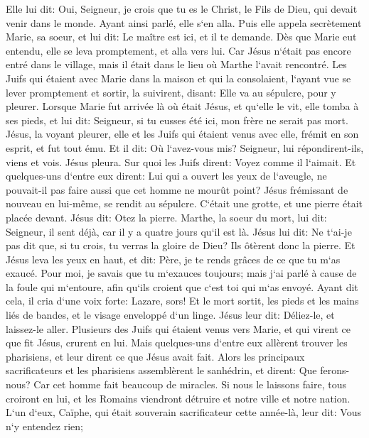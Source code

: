 \verse Elle lui dit: Oui, Seigneur, je crois que tu es le Christ, le Fils de Dieu, qui devait venir dans le monde. 
\verse Ayant ainsi parlé, elle s`en alla. Puis elle appela secrètement Marie, sa soeur, et lui dit: Le maître est ici, et il te demande. 
\verse Dès que Marie eut entendu, elle se leva promptement, et alla vers lui. 
\verse Car Jésus n`était pas encore entré dans le village, mais il était dans le lieu où Marthe l`avait rencontré. 
\verse Les Juifs qui étaient avec Marie dans la maison et qui la consolaient, l`ayant vue se lever promptement et sortir, la suivirent, disant: Elle va au sépulcre, pour y pleurer. 
\verse Lorsque Marie fut arrivée là où était Jésus, et qu`elle le vit, elle tomba à ses pieds, et lui dit: Seigneur, si tu eusses été ici, mon frère ne serait pas mort. 
\verse Jésus, la voyant pleurer, elle et les Juifs qui étaient venus avec elle, frémit en son esprit, et fut tout ému. 
\verse Et il dit: Où l`avez-vous mis? Seigneur, lui répondirent-ils, viens et vois. 
\verse Jésus pleura. 
\verse Sur quoi les Juifs dirent: Voyez comme il l`aimait. 
\verse Et quelques-uns d`entre eux dirent: Lui qui a ouvert les yeux de l`aveugle, ne pouvait-il pas faire aussi que cet homme ne mourût point? 
\verse Jésus frémissant de nouveau en lui-même, se rendit au sépulcre. C`était une grotte, et une pierre était placée devant. 
\verse Jésus dit: Otez la pierre. Marthe, la soeur du mort, lui dit: Seigneur, il sent déjà, car il y a quatre jours qu`il est là. 
\verse Jésus lui dit: Ne t`ai-je pas dit que, si tu crois, tu verras la gloire de Dieu? 
\verse Ils ôtèrent donc la pierre. Et Jésus leva les yeux en haut, et dit: Père, je te rends grâces de ce que tu m`as exaucé. 
\verse Pour moi, je savais que tu m`exauces toujours; mais j`ai parlé à cause de la foule qui m`entoure, afin qu`ils croient que c`est toi qui m`as envoyé. 
\verse Ayant dit cela, il cria d`une voix forte: Lazare, sors! 
\verse Et le mort sortit, les pieds et les mains liés de bandes, et le visage enveloppé d`un linge. Jésus leur dit: Déliez-le, et laissez-le aller. 
\verse Plusieurs des Juifs qui étaient venus vers Marie, et qui virent ce que fit Jésus, crurent en lui. 
\verse Mais quelques-uns d`entre eux allèrent trouver les pharisiens, et leur dirent ce que Jésus avait fait. 
\verse Alors les principaux sacrificateurs et les pharisiens assemblèrent le sanhédrin, et dirent: Que ferons-nous? Car cet homme fait beaucoup de miracles. 
\verse Si nous le laissons faire, tous croiront en lui, et les Romains viendront détruire et notre ville et notre nation. 
\verse L`un d`eux, Caïphe, qui était souverain sacrificateur cette année-là, leur dit: Vous n`y entendez rien; 
